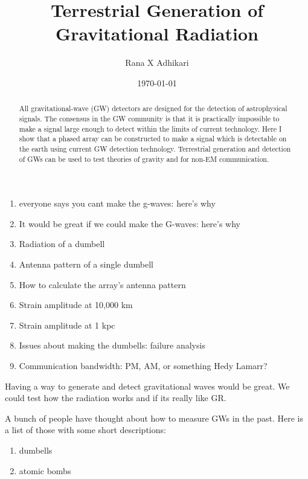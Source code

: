 \documentclass[aps,prl,twocolumn,showpacs,superscriptaddress,groupedaddress]{revtex4-2}  %
\begin{document}
\title{Terrestrial Generation of Gravitational Radiation}
\author{Rana X Adhikari}
\date{\today}


\begin{abstract}
All gravitational-wave (GW) detectors are designed for the detection of astrophysical
signals.
The consensus in the GW community is that it is practically impossible to make a signal large enough to detect within the limits of current technology.
Here I show that a phased array can be constructed to make a signal which is detectable on the earth using current GW detection technology.
Terrestrial generation and detection of GWs can be used to test theories of gravity and for non-EM communication.
\end{abstract}


\maketitle


\begin{enumerate}
  \item everyone says you cant make the g-waves: here's why
  \item It would be great if we could make the G-waves: here's why
  \item Radiation of a dumbell
  \item Antenna pattern of a single dumbell
  \item How to calculate the array's antenna pattern
  \item Strain amplitude at 10,000 km
  \item Strain amplitude at 1 kpc
  \item Issues about making the dumbells: failure analysis
  \item Communication bandwidth: PM, AM, or something Hedy Lamarr?
\end{enumerate}


Having a way to generate and detect gravitational waves would be great.
We could test how the radiation works and if its really like GR.

A bunch of people have thought about how to measure GWs in the past. Here is
a list of those with some short descriptions:
\begin{enumerate}
\item dumbells
\item atomic bombs
\end{enumerate}
\end{document}
